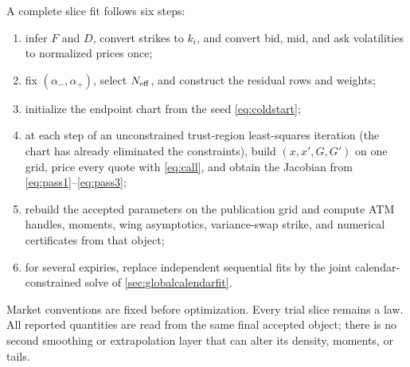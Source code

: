 A complete slice fit follows six steps:
\begin{enumerate}
\item infer $F$ and $D$, convert strikes to $k_i$, and convert bid, mid, and
ask volatilities to normalized prices once;
\item fix $(\alpha_-,\alpha_+)$, select $N_{\rm eff}$, and construct the
residual rows and weights;
\item initialize the endpoint chart from the seed \eqref{eq:coldstart};
\item at each step of an unconstrained trust-region least-squares
iteration (the chart has already eliminated the constraints), build
$(x,x',G,G')$ on one grid, price every quote with
\eqref{eq:call}, and obtain the Jacobian from
\eqref{eq:pass1}--\eqref{eq:pass3};
\item rebuild the accepted parameters on the publication grid and compute ATM
handles, moments, wing asymptotics, variance-swap strike, and numerical
certificates from that object;
\item for several expiries, replace independent sequential fits by the joint
calendar-constrained solve of \cref{sec:globalcalendarfit}.
\end{enumerate}

Market conventions are fixed before optimization.  Every trial slice remains
a law.  All reported quantities are read from the same final accepted object;
there is no second smoothing or extrapolation layer that can alter its
density, moments, or tails.
